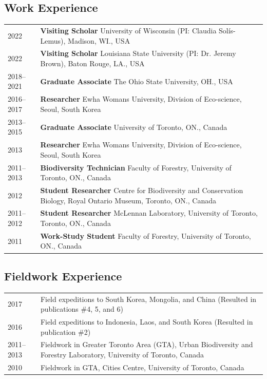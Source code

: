 \documentclass[11pt]{article}
\begin{document}
\subsection*{Work Experience}
\begin{longtable}{p{}  p{}}
2022		   & \textbf{Visiting Scholar} University of Wisconsin (PI: Claudia Solís-Lemus), Madison, WI., USA\\
2022		   & \textbf{Visiting Scholar} Louisiana State University (PI: Dr. Jeremy Brown), Baton Rouge, LA., USA\\
2018--2021 & \textbf{Graduate Associate} The Ohio State University, OH., USA\\
2016--2017 & \textbf{Researcher} Ewha Womans University, Division of Eco-science, Seoul, South Korea\\%
2013--2015 & \textbf{Graduate Associate} University of Toronto, ON., Canada\\
2013 &	\textbf{Researcher} Ewha Womans University, Division of Eco-science, Seoul, South Korea\\%
2011--2013 &	\textbf{Biodiversity Technician} Faculty of Forestry, University of Toronto, ON., Canada\\%
2012 &	\textbf{Student Researcher} Centre for Biodiversity and Conservation Biology, Royal Ontario Museum, Toronto, ON., Canada\\
2011--2012 &	\textbf{Student Researcher} McLennan Laboratory, University of Toronto, Toronto, ON., Canada\\
2011&	\textbf{Work-Study Student} Faculty of Forestry, University of Toronto, ON., Canada\vspace{5pt}\\%
\end{longtable}

\pagebreak
\subsection*{Fieldwork Experience}
\begin{longtable}{p{}  p{}}
2017 & Field expeditions to South Korea, Mongolia, and China (Resulted in publications \#4, 5, and 6)\\
2016 & Field expeditions to Indonesia, Laos, and South Korea (Resulted in publication \#2)\\
2011--2013 & Fieldwork in Greater Toronto Area (GTA), Urban Biodiversity and Forestry Laboratory, University of Toronto, Canada\\
2010 & Fieldwork in GTA, Cities Centre, University of Toronto, Canada\vspace{5pt}\\%
\end{longtable}
\end{document}
